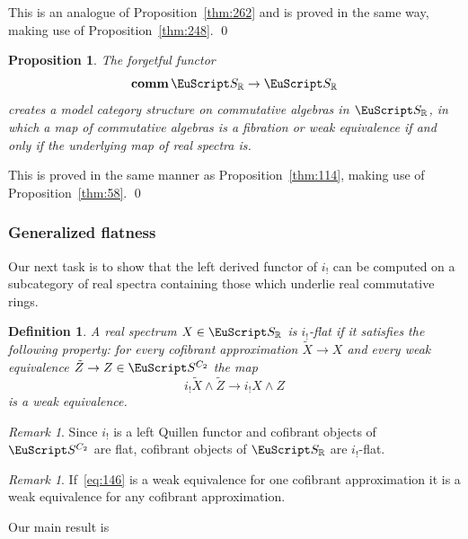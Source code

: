 \documentclass{amsart}
\newtheorem{prop}[equation]{Proposition}
\newtheorem{definition}[equation]{Definition}
\newenvironment{defin}{\begin{definition}\rm}{\end{definition}}
\newtheorem{rem}[equation]{Remark}
\theoremstyle{definition}
\newtheorem{defin}[equation]{Definition}
\theoremstyle{remark}
\newtheorem{rem}[equation]{Remark}
\newenvironment{pf}{\bigskip{\em Proof:\/}}{\qed\medskip}
\newcommand{\R}{{\mathbb R}}
\newcommand{\spectra}{\EuScript S}
\newcommand{\ugspectra}[1]{\spectra^{#1}}
\newcommand{\zt}{C_{2}}
\DeclareMathOperator{\comm}{\mathbf{comm}}
\newcommand{\rspectra}{\spectra_{\R}}
\begin{document}
\begin{pf}
This is an analogue of Proposition~\ref{thm:262} and is proved in the
same way, making use of Proposition~\ref{thm:248}.
\end{pf}


\begin{prop}
\label{thm:217} The forgetful functor 
\[
\comm\rspectra \to \rspectra
\]
creates a model category structure on commutative algebras in
$\rspectra$, in which a map of commutative algebras is a fibration or
weak equivalence if and only if the underlying map of real spectra is.
\end{prop}

\begin{pf}
This is proved in the same manner as Proposition~\ref{thm:114}, making
use of Proposition~\ref{thm:58}.   
\end{pf}

\subsubsection{Generalized flatness}
\label{sec:generalized-flatness}

Our next task is to show that the left derived functor of $i_{!}$ can
be computed on a subcategory of real spectra containing those which
underlie real commutative rings.

\begin{defin}
\label{def:50} A real spectrum $X\in\rspectra$ is {\em
$i_{!}$-flat} if it satisfies the following property: for every
cofibrant approximation $\tilde X\to X$ and every weak equivalence
$\tilde Z\to Z\in\ugspectra{\zt}$
the map
\begin{equation}
\label{eq:146}
i_{!}\tilde X\wedge \tilde Z \to 
i_{!} X\wedge Z
\end{equation}
is a weak equivalence.  
\end{defin}

\begin{rem}
\label{rem:71} 
Since $i_{!}$ is a left Quillen functor and cofibrant objects of
$\ugspectra{\zt}$ are flat, cofibrant objects of $\rspectra$ are
$i_{!}$-flat.
\end{rem}

\begin{rem}
\label{rem:50} If~\eqref{eq:146} is a weak equivalence for one
cofibrant approximation it is a weak equivalence for any cofibrant
approximation.   
\end{rem}

Our main result is
\end{document}

